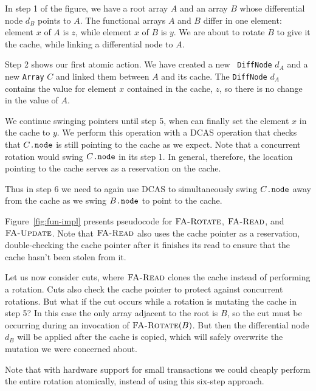 \documentclass{csa-sig-alternate}
\newcommand{\funcname}[1]{\ensuremath{\text{\sc #1}}}
\newcommand{\fref}[2]{\ensuremath{#1\text{\tt .#2}}}
\begin{document}
{In step 1 of the figure, we have a root array $A$ and an
array $B$ whose differential node $d_B$ points to $A$.  The functional
arrays $A$ and $B$ differ in one element: element $x$ of $A$ is $z$,
while element $x$ of $B$ is $y$.  We are about to rotate $B$ to give
it the cache, while linking a differential node to $A$.

Step 2 shows our first atomic action.  We have created a new {\tt
  DiffNode} $d_A$ and a new {\tt Array} $C$ and linked them between
$A$ and its cache.  The {\tt DiffNode} $d_A$ contains the value for
element $x$ contained in the cache, $z$, so there is no change in
the value of $A$.

We continue swinging pointers until step 5, when can finally set
the element $x$ in the cache to $y$.  We perform this operation with a
DCAS operation that checks that $\fref{C}{node}$ is still pointing to
the cache as we expect.  Note that a concurrent rotation would swing
$\fref{C}{node}$ in its step 1.  In general, therefore, the location
pointing to the cache serves as a reservation on the cache.

Thus in step 6 we need to again use DCAS to simultaneously swing
$\fref{C}{node}$ away 
from the cache as we swing $\fref{B}{node}$ to point to the cache.

Figure~\ref{fig:fun-impl} presents pseudocode for \funcname{FA-Rotate},
\funcname{FA-Read}, and \funcname{FA-Update}.  Note that \funcname{FA-Read} also
uses the cache pointer as a reservation,
double-checking the cache pointer after it finishes its read to ensure that the
cache hasn't been stolen from it.

Let us now consider cuts, where \funcname{FA-Read} clones the cache
instead of performing a rotation.   Cuts also check the cache pointer
to protect against concurrent rotations.  But what if the cut occurs
while a rotation is mutating the cache in step 5?  In this case the
only array adjacent to the root is $B$, so the cut must be occurring
during an invocation of $\funcname{FA-Rotate}(B)$.  But then the
differential node $d_B$ will be applied after the cache is copied,
which will safely overwrite the mutation we were concerned about.

Note that with hardware support for small transactions \cite{HerlihyMo93}
we could cheaply perform the entire rotation atomically, instead of
using this six-step approach.



}
\end{document}
